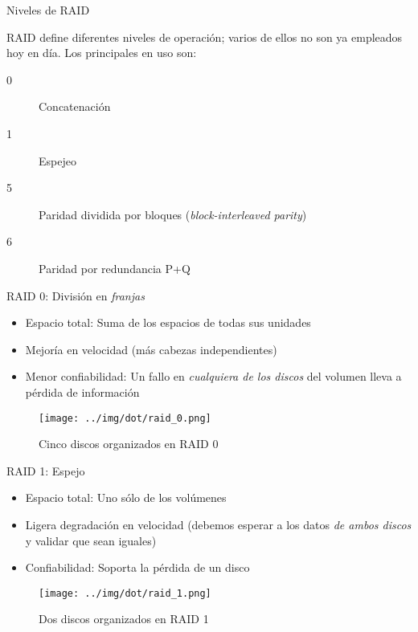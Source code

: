 \documentclass[presentation]{beamer}
\begin{document}
\begin{frame}[label={sec:org64571aa}]{Niveles de RAID}
\begin{center}
RAID define diferentes niveles de operación; varios de ellos no son
ya empleados hoy en día. Los principales en uso son:
\end{center}
\begin{description}
\item[{0}] Concatenación
\item[{1}] Espejeo
\item[{5}] Paridad dividida por bloques (\emph{block-interleaved parity})
\item[{6}] Paridad por redundancia P+Q
\end{description}
\end{frame}

\begin{frame}[label={sec:org85ddbd8}]{RAID 0: División en \emph{franjas}}
\begin{itemize}
\item Espacio total: Suma de los espacios de todas sus unidades
\item Mejoría en velocidad (más cabezas independientes)
\item Menor confiabilidad: Un fallo en \emph{cualquiera de los discos} del
volumen lleva a pérdida de información
\end{itemize}
\begin{figure}[htbp]
\centering
\texttt{[image: ../img/dot/raid\_0.png]}
\caption{Cinco discos organizados en RAID 0}
\end{figure}
\end{frame}

\begin{frame}[label={sec:orge50fcae}]{RAID 1: Espejo}
\begin{itemize}
\item Espacio total: Uno sólo de los volúmenes
\item Ligera degradación en velocidad (debemos esperar a los datos \emph{de
ambos discos} y validar que sean iguales)
\item Confiabilidad: Soporta la pérdida de un disco
\end{itemize}
\begin{figure}[htbp]
\centering
\texttt{[image: ../img/dot/raid\_1.png]}
\caption{Dos discos organizados en RAID 1}
\end{figure}
\end{frame}
\end{document}
